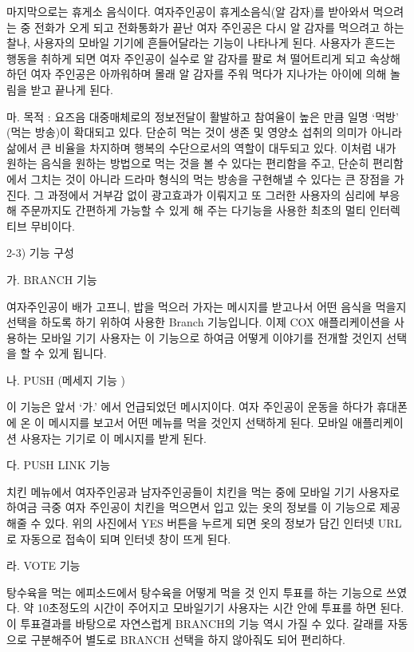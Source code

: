 \documentclass{oblivoir}
\begin{document}
마지막으로는 휴게소 음식이다. 여자주인공이 휴게소음식(알 감자)를 받아와서 먹으려는 중 전화가 오게 되고 전화통화가 끝난 여자 주인공은 다시 알 감자를 먹으려고 하는 찰나, 사용자의 모바일 기기에 흔들어달라는 기능이 나타나게 된다. 사용자가 흔드는 행동을 취하게 되면 여자 주인공이 실수로 알 감자를 팔로 쳐 떨어트리게 되고 속상해하던 여자 주인공은 아까워하며 몰래 알 감자를 주워 먹다가 지나가는 아이에 의해 놀림을 받고 끝나게 된다.

마. 목적 : 요즈음 대중매체로의 정보전달이 활발하고 참여율이 높은 만큼 일명 ‘먹방’ (먹는 방송)이 확대되고 있다. 단순히 먹는 것이 생존 및 영양소 섭취의 의미가 아니라 삶에서 큰 비율을 차지하며 행복의 수단으로서의 역할이 대두되고 있다. 이처럼 내가 원하는 음식을 원하는 방법으로 먹는 것을 볼 수 있다는 편리함을 주고, 단순히 편리함에서 그치는 것이 아니라 드라마 형식의 먹는 방송을 구현해낼 수 있다는 큰 장점을 가진다. 그 과정에서 거부감 없이 광고효과가 이뤄지고 또 그러한 사용자의 심리에 부응해 주문까지도 간편하게 가능할 수 있게 해 주는 다기능을 사용한 최초의 멀티 인터렉티브 무비이다.  

2-3) 기능 구성

가. BRANCH 기능

여자주인공이 배가 고프니, 밥을 먹으러 가자는 메시지를 받고나서 어떤 음식을 먹을지 선택을 하도록 하기 위하여 사용한 Branch 기능입니다. 이제 COX 애플리케이션을 사용하는 모바일 기기 사용자는 이 기능으로 하여금 어떻게 이야기를 전개할 것인지 선택을 할 수 있게 됩니다. 

나. PUSH (메세지 기능 )

이 기능은 앞서 ‘가.’ 에서 언급되었던 메시지이다. 여자 주인공이 운동을 하다가 휴대폰에 온 이 메시지를 보고서 어떤 메뉴를 먹을 것인지 선택하게 된다. 모바일 애플리케이션 사용자는 기기로 이 메시지를 받게 된다.

다. PUSH LINK 기능

치킨 메뉴에서 여자주인공과 남자주인공들이 치킨을 먹는 중에 모바일 기기 사용자로 하여금 극중 여자 주인공이 치킨을 먹으면서 입고 있는 옷의 정보를 이 기능으로 제공해줄 수 있다. 위의 사진에서 YES 버튼을 누르게 되면 옷의 정보가 담긴 인터넷 URL로 자동으로 접속이 되며 인터넷 창이 뜨게 된다.

라. VOTE 기능

탕수육을 먹는 에피소드에서 탕수육을 어떻게 먹을 것 인지 투표를 하는 기능으로 쓰였다. 약 10초정도의 시간이 주어지고 모바일기기 사용자는 시간 안에 투표를 하면 된다. 이 투표결과를 바탕으로 자연스럽게 BRANCH의 기능 역시 가질 수 있다. 갈래를 자동으로 구분해주어 별도로 BRANCH 선택을 하지 않아줘도 되어 편리하다. 
\end{document}
